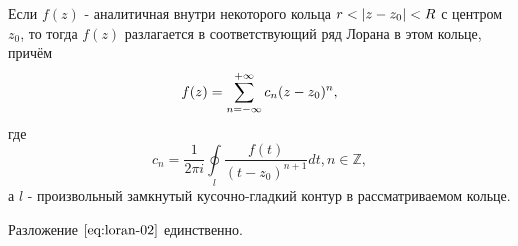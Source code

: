 
\begin{col-answer-preambule}
\end{col-answer-preambule}

\begin{theorem}
  Если $f(z)$ - аналитичная внутри некоторого кольца $r < \left\lvert z - z_0 \right\rvert < R$
  с центром $z_0$, то тогда $f(z)$ разлагается в соответствующий ряд Лорана в этом кольце,
  причём
  \begin{equation}
    \label{eq:loran-02}
    f(z) = \sum\limits_{n = -\infty}^{+\infty}c_n(z - z_0)^n,
  \end{equation}
  где
  \begin{equation}
    \label{eq:loran-03}
    c_n = \dfrac{1}{2\pi i}\oint\limits_l\dfrac{f(t)}{(t - z_0)^{n+1}}dt, n \in \mathbb{Z},
  \end{equation}
  а $l$ - произвольный замкнутый кусочно-гладкий контур в рассматриваемом кольце.

  Разложение $\eqref{eq:loran-02}$ единственно.
\end{theorem}
